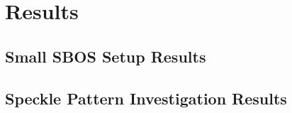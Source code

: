 
\chapter{Results}
\label{chapter: Results}



\section{Small SBOS Setup Results}


\section{Speckle Pattern Investigation Results}


